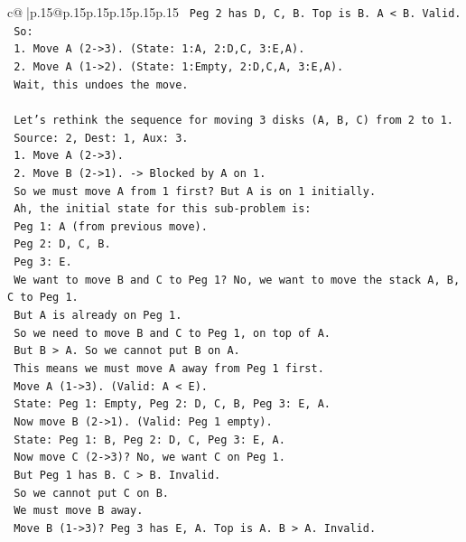 \documentclass{article}
\begin{document}
{\begin{supertabular}{c@{$\;$}|p{.15\linewidth}@{}p{.15\linewidth}p{.15\linewidth}p{.15\linewidth}p{.15\linewidth}p{.15\linewidth}}
{{{\texttt{  Peg 2 has D, C, B. Top is B. A < B. Valid.} \\
\texttt{  So:} \\
\texttt{  1. Move A (2{-}>3). (State: 1:A, 2:D,C, 3:E,A).} \\
\texttt{  2. Move A (1{-}>2). (State: 1:Empty, 2:D,C,A, 3:E,A).} \\
\texttt{     Wait, this undoes the move.} \\
\\ 
\texttt{  Let's rethink the sequence for moving 3 disks (A, B, C) from 2 to 1.} \\
\texttt{  Source: 2, Dest: 1, Aux: 3.} \\
\texttt{  1. Move A (2{-}>3).} \\
\texttt{  2. Move B (2{-}>1). {-}> Blocked by A on 1.} \\
\texttt{  So we must move A from 1 first? But A is on 1 initially.} \\
\texttt{  Ah, the initial state for this sub{-}problem is:} \\
\texttt{  Peg 1: A (from previous move).} \\
\texttt{  Peg 2: D, C, B.} \\
\texttt{  Peg 3: E.} \\
\texttt{  We want to move B and C to Peg 1? No, we want to move the stack A, B, C to Peg 1.} \\
\texttt{  But A is already on Peg 1.} \\
\texttt{  So we need to move B and C to Peg 1, on top of A.} \\
\texttt{  But B > A. So we cannot put B on A.} \\
\texttt{  This means we must move A away from Peg 1 first.} \\
\texttt{  Move A (1{-}>3). (Valid: A < E).} \\
\texttt{  State: Peg 1: Empty, Peg 2: D, C, B, Peg 3: E, A.} \\
\texttt{  Now move B (2{-}>1). (Valid: Peg 1 empty).} \\
\texttt{  State: Peg 1: B, Peg 2: D, C, Peg 3: E, A.} \\
\texttt{  Now move C (2{-}>3)? No, we want C on Peg 1.} \\
\texttt{  But Peg 1 has B. C > B. Invalid.} \\
\texttt{  So we cannot put C on B.} \\
\texttt{  We must move B away.} \\
\texttt{  Move B (1{-}>3)? Peg 3 has E, A. Top is A. B > A. Invalid.} \\
}}}
\end{supertabular}}
\end{document}
